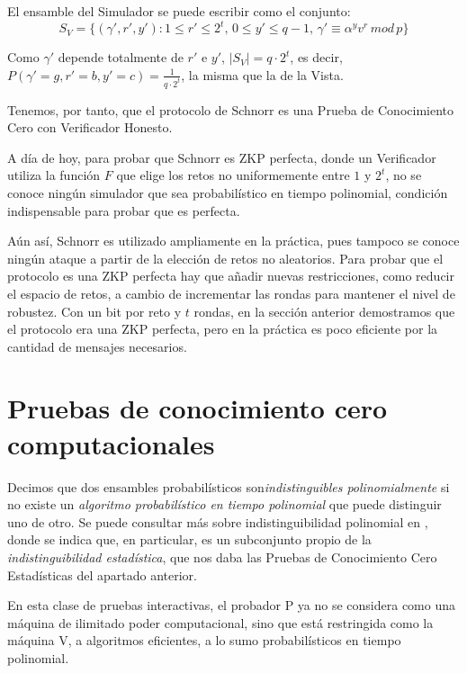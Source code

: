El ensamble del Simulador se puede escribir como el conjunto:
\[
S_{V} = \{ (\gamma', r', y') : 1\leq r' \leq 2^t,\, 0\leq y'\leq q-1,\, \gamma' \equiv \alpha^y v^r \, mod \, p \}
\]

Como $\gamma'$ depende totalmente de $r'$ e $y'$, $\mid S_V \mid = q\cdot 2^t$, es decir, $P(\gamma'=g, r'=b, y'=c)=\frac{1}{q\cdot 2^t}$, la misma que la de la Vista. 


Tenemos, por tanto, que el protocolo de Schnorr es una Prueba de Conocimiento Cero con Verificador Honesto.

\hfil

A día de hoy, para probar que Schnorr es ZKP perfecta, donde un Verificador utiliza la función $F$ que elige los retos no uniformemente entre $1$ y $2^t$, no se conoce ningún simulador que sea probabilístico en tiempo polinomial, condición indispensable para probar que es perfecta.


Aún así, Schnorr es utilizado ampliamente en la práctica, pues tampoco se conoce ningún ataque a partir de la elección de retos no aleatorios. Para probar que el protocolo es una ZKP perfecta hay que añadir nuevas restricciones, como reducir el espacio de retos, a cambio de incrementar las rondas para mantener el nivel de robustez. Con un bit por reto y $t$ rondas, en la sección anterior demostramos que el protocolo era una ZKP perfecta, pero en la práctica es poco eficiente por la cantidad de mensajes necesarios.


\hfil


\section{Pruebas de conocimiento cero computacionales}

Decimos que dos ensambles probabilísticos son\textit{indistinguibles polinomialmente} si no existe un \textit{algoritmo probabilístico en tiempo polinomial} que puede distinguir uno de otro. Se puede consultar más sobre indistinguibilidad polinomial en \citep{book:856771}, donde se indica que, en particular, es un subconjunto propio de la \textit{indistinguibilidad estadística}, que nos daba las Pruebas de Conocimiento Cero Estadísticas del apartado anterior.

En esta clase de pruebas interactivas, el probador P ya no se considera como una máquina de ilimitado poder computacional, sino que está restringida como la máquina V, a algoritmos eficientes, a lo sumo probabilísticos en tiempo polinomial.

